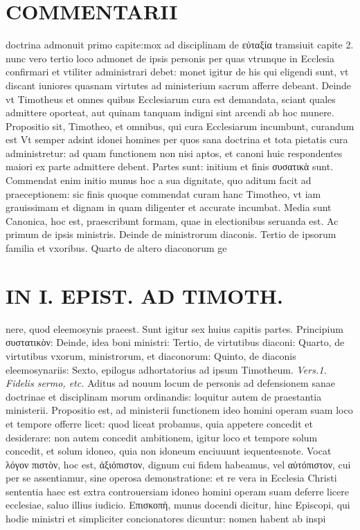 \documentclass{article}
\begin{document}
\begin{pages}
\section*{COMMENTARII }
\marginpar{[ p.60 ]}\pstart doctrina admonuit primo capite:mox ad disciplinam de εὐταξία tramsiuit capite 2. nunc vero tertio loco admonet de ipsis personis per quas vtrunque in Ecclesia confirmari et vtiliter administrari debet: monet igitur de his qui eligendi sunt, vt discant iuniores quasnam virtutes ad ministerium sacrum afferre debeant. Deinde vt Timotheus et omnes quibus Ecclesiarum cura est demandata, sciant quales admittere oporteat, aut quinam tanquam indigni sint arcendi ab hoc munere.  \pend\pstart Propositio sit, Timotheo, et omnibus, qui cura Ecclesiarum incumbunt, curandum est Vt semper adsint idonei homines per quos sana doctrina et tota pietatis cura administretur: ad quam functionem non nisi aptos, et canoni huic respondentes maiori ex parte admittere debent.  \pend\pstart Partes sunt: initium et finis συσατικὰ sunt. Commendat enim initio munus hoc a sua dignitate, quo aditum facit ad praeceptionem: sic finis quoque commendat curam hanc Timotheo, vt iam grauissimam et dignam in quam diligenter et accurate incumbat. Media sunt Canonica, hoc est, praescribunt formam, quae in electionibus seruanda est. Ac primum de ipsis ministris. Deinde de ministrorum diaconis. Tertio de ipsorum familia et vxoribus. Quarto de altero diaconorum ge\pend
\section*{IN I. EPIST. AD TIMOTH. }
\marginpar{[ p.61 ]}\pstart nere, quod eleemosynis praeest. Sunt igitur sex huius capitis partes. Principium συστατικὸν: Deinde, idea boni ministri: Tertio, de virtutibus diaconi: Quarto, de virtutibus vxorum, ministrorum, et diaconorum: Quinto, de diaconis eleemosynariis: Sexto, epilogus adhortatorius ad ipsum Timotheum.  \pend
\textit{Vers.1. Fidelis sermo, etc. }\pstart Aditus ad nouum locum de personis ad defensionem sanae doctrinae et disciplinam morum ordinandis: loquitur autem de praestantia ministerii. Propositio est, ad ministerii functionem ideo homini operam suam loco et tempore offerre licet: quod liceat probamus, quia appetere concedit et desiderare: non autem concedit ambitionem, igitur loco et tempore solum concedit, et solum idoneo, quia non idoneum enciuuunt iequentesnote.  \pend\pstart Vocat λόγον πιστὸν, hoc est, ἀξιόπιστον, dignum cui fidem habeamus, vel αὐτόπιστον, cui per se assentiamur, sine operosa demonstratione: et re vera in Ecclesia Christi sententia haec est extra controuersiam idoneo homini operam suam deferre licere ecclesiae, saluo illius iudicio.  \pend\pstart Επισκοπὴ, munus docendi dicitur, hinc Episcopi, qui hodie ministri et simpliciter concionatores dicuntur: nomen habent ab inspi\pend

\end{pages}
\end{document}

